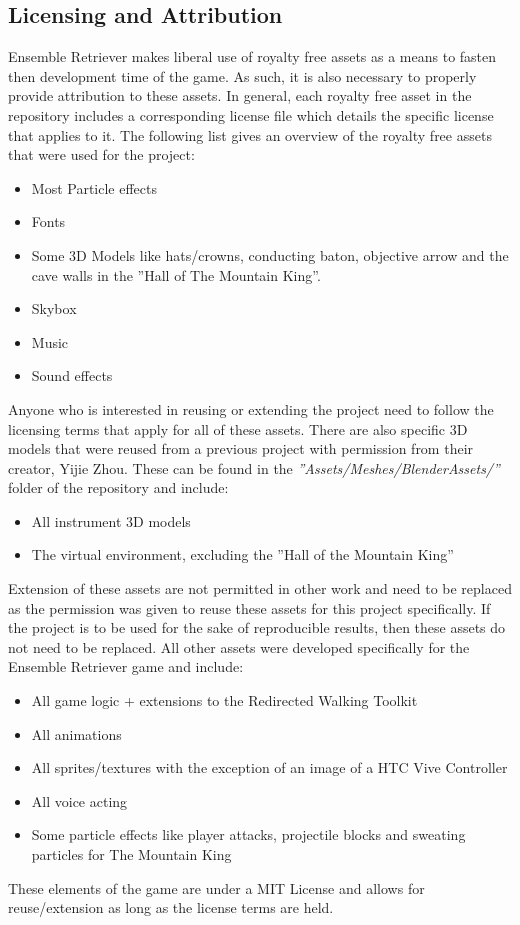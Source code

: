 \subsection{Licensing and Attribution}
Ensemble Retriever makes liberal use of royalty free assets as a means to fasten then development time of the game. As such, it is also necessary to properly provide attribution to these assets. In general, each royalty free asset in the repository includes a corresponding license file which details the specific license that applies to it. The following list gives an overview of the royalty free assets that were used for the project:
\begin{itemize}
    \item Most Particle effects
    \item Fonts
    \item Some 3D Models like hats/crowns, conducting baton, objective arrow and the cave walls in the ''Hall of The Mountain King''.
    \item Skybox
    \item Music
    \item Sound effects
\end{itemize}
Anyone who is interested in reusing or extending the project need to follow the licensing terms that apply for all of these assets. There are also specific 3D models that were reused from a previous project with permission from their creator, Yijie Zhou. These can be found in the \emph{''Assets/Meshes/BlenderAssets/''} folder of the repository and include:
\begin{itemize}
    \item All instrument 3D models
    \item The virtual environment, excluding the ''Hall of the Mountain King''
\end{itemize}
Extension of these assets are not permitted in other work and need to be replaced as the permission was given to reuse these assets for this project specifically. If the project is to be used for the sake of reproducible results, then these assets do not need to be replaced. All other assets were developed specifically for the Ensemble Retriever game and include:
\begin{itemize}
    \item All game logic + extensions to the Redirected Walking Toolkit
    \item All animations
    \item All sprites/textures with the exception of an image of a HTC Vive Controller
    \item All voice acting
    \item Some particle effects like player attacks, projectile blocks and sweating particles for The Mountain King 
\end{itemize}
These elements of the game are under a MIT License and allows for reuse/extension as long as the license terms are held. 

